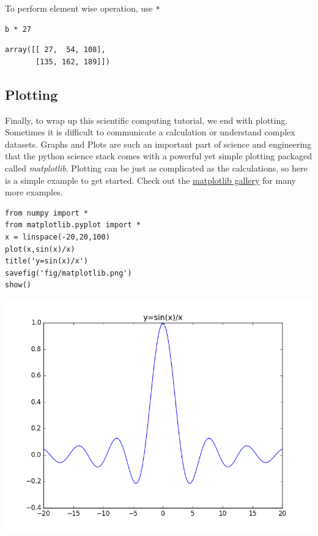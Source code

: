 \documentclass[%
oneside,                 %
final,                   %
10pt]{article}
\begin{document}
To perform element wise operation, use \texttt{*}

\begin{Verbatim}[numbers=none,fontsize=\fontsize{9pt}{9pt},baselinestretch=0.95,xleftmargin=2mm]
b * 27
\end{Verbatim}

\begin{Verbatim}[numbers=none,fontsize=\fontsize{9pt}{9pt},baselinestretch=0.95,xleftmargin=2mm]
array([[ 27,  54, 108],
       [135, 162, 189]])
\end{Verbatim}


\subsection{Plotting}

Finally, to wrap up this scientific computing tutorial, we end with plotting. Sometimes it is difficult to communicate a calculation or understand complex datasets. Graphs and Plots are such an important part of science and engineering that the python science stack comes with a powerful yet simple plotting packaged called \emph{matplotlib}. Plotting can be just as complicated as the calculations, so here is a simple example to get started. Check out the \href{{http://matplotlib.org/gallery.html}}{matplotlib gallery} for many more examples.

\begin{Verbatim}[numbers=none,fontsize=\fontsize{9pt}{9pt},baselinestretch=0.95,xleftmargin=2mm]
from numpy import *
from matplotlib.pyplot import *
x = linspace(-20,20,100)
plot(x,sin(x)/x)
title('y=sin(x)/x')
savefig('fig/matplotlib.png')
show()
\end{Verbatim}



\centerline{\includegraphics[width=0.9\linewidth]{fig/matplotlib.png}}
\end{document}
